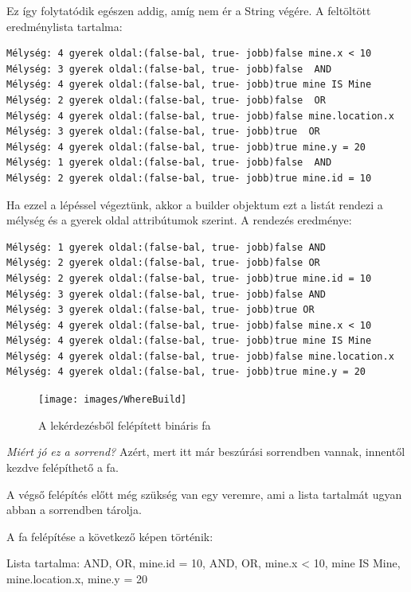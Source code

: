 Ez így folytatódik egészen addig, amíg nem ér a String végére. A feltöltött eredménylista tartalma:

\begin{verbatim}
Mélység: 4 gyerek oldal:(false-bal, true- jobb)false mine.x < 10
Mélység: 3 gyerek oldal:(false-bal, true- jobb)false  AND
Mélység: 4 gyerek oldal:(false-bal, true- jobb)true mine IS Mine 
Mélység: 2 gyerek oldal:(false-bal, true- jobb)false  OR
Mélység: 4 gyerek oldal:(false-bal, true- jobb)false mine.location.x 
Mélység: 3 gyerek oldal:(false-bal, true- jobb)true  OR
Mélység: 4 gyerek oldal:(false-bal, true- jobb)true mine.y = 20 
Mélység: 1 gyerek oldal:(false-bal, true- jobb)false  AND
Mélység: 2 gyerek oldal:(false-bal, true- jobb)true mine.id = 10 
\end{verbatim}

Ha ezzel a lépéssel végeztünk, akkor a builder objektum ezt a listát rendezi a mélység és a gyerek oldal attribútumok szerint.
A rendezés eredménye:

\begin{verbatim}
Mélység: 1 gyerek oldal:(false-bal, true- jobb)false AND
Mélység: 2 gyerek oldal:(false-bal, true- jobb)false OR
Mélység: 2 gyerek oldal:(false-bal, true- jobb)true mine.id = 10
Mélység: 3 gyerek oldal:(false-bal, true- jobb)false AND
Mélység: 3 gyerek oldal:(false-bal, true- jobb)true OR
Mélység: 4 gyerek oldal:(false-bal, true- jobb)false mine.x < 10
Mélység: 4 gyerek oldal:(false-bal, true- jobb)true mine IS Mine
Mélység: 4 gyerek oldal:(false-bal, true- jobb)false mine.location.x
Mélység: 4 gyerek oldal:(false-bal, true- jobb)true mine.y = 20
\end{verbatim}

\begin{figure}[htb]
	\begin{center}
		\texttt{[image: images/WhereBuild]}
		\caption{A lekérdezésből felépített bináris fa}
		\label{fig:wherePostorderBuilder}
	\end{center}
\end{figure}

\textit{Miért jó ez a sorrend?}
Azért, mert itt már beszúrási sorrendben vannak, innentől kezdve felépíthető a fa.

A végső felépítés előtt még szükség van egy veremre, ami a lista tartalmát ugyan abban a sorrendben tárolja.

A fa felépítése a következő képen történik:

Lista tartalma: AND, OR, mine.id = 10, AND, OR, mine.x < 10, mine IS Mine, mine.location.x, mine.y = 20

